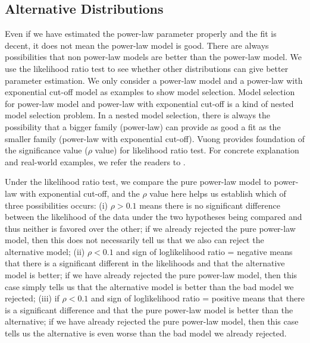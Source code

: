 \documentclass[10pt,conference,letterpaper]{IEEEtran}
\begin{document}
\subsection{Alternative Distributions}
Even if we have estimated the power-law parameter properly and the fit is decent, it does not mean the power-law model is good.
There are always possibilities that non power-law models are better than the power-law model.
We use the likelihood ratio test \cite{vuong1989likelihood} to see whether other distributions can give better parameter estimation.
We only consider a power-law model and a power-law with exponential cut-off model as examples to show model selection.
Model selection for power-law model and power-law with exponential cut-off is a kind of nested model selection problem. 
In a nested model selection,  there is always the possibility that a bigger family (power-law) can provide as good a fit as the smaller family (power-law with exponential cut-off). 
Vuong \cite{vuong1989likelihood} provides foundation of the significance value ($\rho$ value) for likelihood ratio test. 
For concrete explanation and real-world examples, we refer the readers to \cite{clauset2009power}.

Under the likelihood ratio test, we compare the pure power-law model to power-law with exponential cut-off, and the $\rho$ value here helps us establish which of three possibilities occurs: (i) $\rho > 0.1$ means there is no significant difference between the likelihood of the data under the two hypotheses being compared and thus neither is favored over the other; if we already rejected the pure power-law model, then this does not necessarily tell us that we also can reject the alternative model; (ii) $\rho  < 0.1$ and sign of loglikelihood ratio = negative means that there is a significant different in the likelihoods and that the alternative model is better; if we have already rejected the pure power-law model, then this case simply tells us that the alternative model is better than the bad model we rejected; (iii) if $\rho < 0.1$ and sign of loglikelihood ratio = positive means that there is a significant difference and that the pure power-law model is better than the alternative; if we have already rejected the pure power-law model, then this case tells us the alternative is even worse than the bad model we already rejected.
\end{document}

